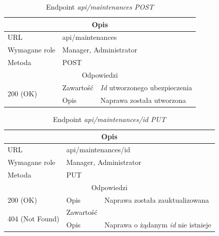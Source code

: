 \documentclass[eng,printmode,openany]{mgr}
\begin{document}
\begin{table}[H]
	\caption{Endpoint \textit{api/maintenances POST}}
	\begin{tabularx}{\textwidth}{|l|l|X|}
		\hline
		\multicolumn{3}{|c|}{Opis}
		\\ \hline
		URL                       & \multicolumn{2}{l|}{api/maintenances}
		\\ \hline
		Wymagane role             & \multicolumn{2}{l|}{Manager, Administrator}
		\\ \hline
		Metoda                    & \multicolumn{2}{l|}{POST}
		\\ \hline
		\multicolumn{3}{|c|}{Odpowiedzi}
		\\ \hline
		\multirow{2}{*}{200 (OK)} 		& Zawartość     & \textit{Id} utworzonego ubezpieczenia
		\\ \cline{2-3}                  & Opis         	& Naprawa została utworzona
		\\ \hline
	\end{tabularx}
\end{table}

\begin{table}[H]
	\caption{Endpoint \textit{api/maintenances/id PUT}}
	\begin{tabularx}{\textwidth}{|l|l|X|}
		\hline
		\multicolumn{3}{|c|}{Opis}
		\\ \hline
		URL                       & \multicolumn{2}{l|}{api/maintenances/id}
		\\ \hline
		Wymagane role             & \multicolumn{2}{l|}{Manager, Administrator}
		\\ \hline
		Metoda                    & \multicolumn{2}{l|}{PUT}
		\\ \hline
		\multicolumn{3}{|c|}{Odpowiedzi}
		\\ \hline
		200 (OK) 		                        & Opis      	& Naprawa została zauktualizowana
		\\ \hline
		\multirow{2}{*}{404 (Not Found)} 	    & Zawartość     & 
		\\ \cline{2-3}                          & Opis          & Naprawa o żądanym \textit{id} nie istnieje
		\\ \hline
	\end{tabularx}
\end{table}
\end{document}
